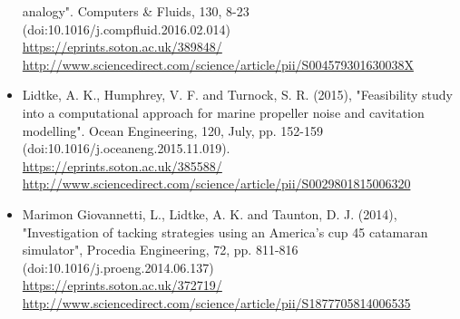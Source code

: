 \documentclass[a4paper,10pt]{article}
\begin{document}
\begin{itemize}
	analogy". Computers \& Fluids, 130, 8-23
	\cite{Lidtke2016}
	\\ (doi:10.1016/j.compfluid.2016.02.014)
	\\ \url{https://eprints.soton.ac.uk/389848/}
	\\ \url{http://www.sciencedirect.com/science/article/pii/S004579301630038X}
%
\item Lidtke, A. K., Humphrey, V. F. and Turnock, S. R. (2015), "Feasibility study
	into a computational approach for marine propeller noise and cavitation modelling".
	Ocean Engineering, 120, July, pp. 152-159
	\cite{Lidtke2016a}
	\\ (doi:10.1016/j.oceaneng.2015.11.019).
	\\ \url{https://eprints.soton.ac.uk/385588/}
	\\ \url{http://www.sciencedirect.com/science/article/pii/S0029801815006320}
%
\item Marimon Giovannetti, L., Lidtke, A. K. and Taunton, D. J. (2014), "Investigation
	of tacking strategies using an America's cup 45 catamaran simulator", Procedia
	Engineering, 72, pp. 811-816
	\cite{Giovannetti2014}
	\\ (doi:10.1016/j.proeng.2014.06.137)
	\\ \url{https://eprints.soton.ac.uk/372719/}
	\\ \url{http://www.sciencedirect.com/science/article/pii/S1877705814006535}
%
\end{itemize}

\end{document}
